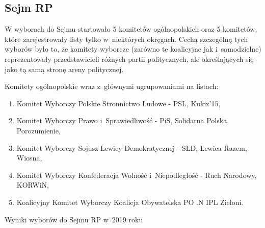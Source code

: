 \subsection{Sejm RP}

W wyborach do Sejmu startowało 5 komitetów ogólnopolskich oraz 5 komitetów, które zarejestrowały listy tylko w~niektórych okręgach. Cechą szczególną tych wyborów było to, że komitety wyborcze (zarówno te koalicyjne jak i~samodzielne) reprezentowały przedstawicieli różnych partii politycznych, ale określających się jako tą samą stronę areny politycznej.

Komitety ogólnopolskie wraz z~głównymi ugrupowaniami na listach:
\begin{enumerate}
  \item Komitet Wyborczy Polskie Stronnictwo Ludowe - PSL, Kukiz'15,
  \item Komitet Wyborczy Prawo i~Sprawiedliwość - PiS, Solidarna Polska, Porozumienie,
  \item Komitet Wyborczy Sojusz Lewicy Demokratycznej - SLD, Lewica Razem, Wiosna,
  \item Komitet Wyborczy Konfederacja Wolność i~Niepodległość - Ruch Narodowy, KORWiN,
  \item Koalicyjny Komitet Wyborczy Koalicja Obywatelska PO .N IPL Zieloni.
\end{enumerate}


\begin{table}[h!]
\caption{Wyniki wyborów do Sejmu RP w~2019 roku}
\caption*{Źródło: \url{sejmsenat2019.pkw.gov.pl}}
\end{table}


